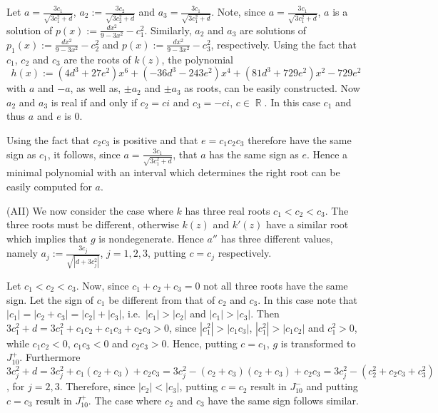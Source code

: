 \documentclass[noend]{amsproc}
\theoremstyle{definition}
\DeclareMathOperator{\R}{\mathbb{R}}
\begin{document}
Let $a=\frac{3c_1}{\sqrt{3c_1^2+d}}$, $a_2:=\frac{3c_2}{\sqrt{3c_2^2+d}}$ and $a_3=\frac{3c_1}{\sqrt{3c_1^2+d}}$. Note, since $a=\frac{3c_1}{\sqrt{3c_1^2+d}}$, $a$ is a solution of $p(x):=\frac{dx^2}{9-3x^2}-c_1^2$. Similarly, $a_2$ and $a_3$ are solutions of $p_1(x):=\frac{dx^2}{9-3x^2}-c_2^2$ and $p(x):=\frac{dx^2}{9-3x^2}-c_3^2$, respectively.  Using the fact that $c_1$, $c_2$ and $c_3$ are  the roots of $k(z)$, 
the polynomial
\[h(x):=(4d^3+27e^2)x^6+(-36d^3-243e^2)x^4+(81d^3+729e^2)x^2-729e^2\]
with $a$ and $-a$, as well as, $\pm a_2$ and $\pm a_3$ as roots, can be easily constructed. Now $a_2$ and $a_3$ is real if and only if $c_2=ci$ and $c_3=-ci$, $c\in\R$. In this case $c_1$ and thus $a$ and $e$ is $0$. 

Using the fact that $c_2c_3$ is positive and that $e=c_1c_2c_3$ therefore have the same sign as $c_1$, it follows, since $a=\frac{3c_1}{\sqrt{3c_1^2+d}}$, that $a$ has the same sign as $e$. Hence a minimal polynomial with an interval which determines the right root can be easily computed for $a$. 

(AII) We now consider the case where $k$ has three real roots $c_1<c_2<c_3$.
The three roots must be different, otherwise $k(z)$ and $k'(z)$ have a similar
root which implies that $g$ is nondegenerate. Hence $a''$ has three different values, namely
$a_j:=\frac{3c_j}{\sqrt{|d+3c_j^2|}}$, $j=1,2,3$, putting $c=c_j$ respectively.

Let $c_1<c_2<c_3$. Now, since $c_1+c_2+c_3=0$ not all three roots have the same
sign. Let the sign of $c_1$ be different from that of $c_2$ and $c_3$. In this
case note that $|c_1|=|c_2+c_3|=|c_2|+|c_3|$, i.e.~$|c_1|>|c_2|$ and
$|c_1|>|c_3|$. Then $3c_1^2+d=3c_1^2+c_1c_2+c_1c_3+c_2c_3>0$, since
$|c_1^2|>|c_1c_3|$, $|c_1^2|>|c_1c_2|$ and $c_1^2>0$, while $c_1c_2<0$,
$c_1c_3<0$ and $c_2c_3>0$. Hence, putting $c=c_1$, $g$ is transformed to
$J_{10}^+$.
Furthermore
$3c_j^2+d=3c_j^2+c_1(c_2+c_3)+c_2c_3=3c_j^2-(c_2+c_3)(c_2+c_3)+c_2c_3
=3c_j^2-(c_2^2+c_2c_3+c_3^2)$,
for $j=2,3$. Therefore, since $|c_2|<|c_3|$, putting $c=c_2$ result in
$J_{10}^-$ and putting $c=c_3$ result in $J_{10}^+$. The case where $c_2$ and $c_3$ have the same sign follows similar. 
\end{document}
